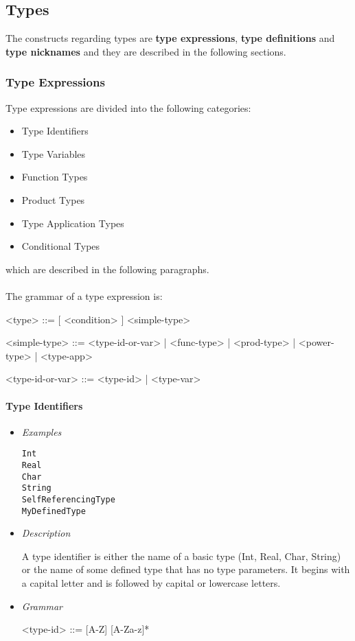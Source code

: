 \documentclass{article}
\begin{document}
\subsection{Types}
\label{subsec:types}

The constructs regarding types are \textbf{type expressions}, \textbf{type
definitions} and \textbf{type nicknames} and they are described in the
following sections.

\subsubsection{Type Expressions}

Type expressions are divided into the following categories:
\begin{itemize}
\item Type Identifiers
\item Type Variables
\item Function Types
\item Product Types
\item Type Application Types
\item Conditional Types
\end{itemize}
which are described in the following paragraphs.
\\\\
The grammar of a type expression is:
\begin{grammar}
<type> ::= [ <condition> ]  <simple-type> 

<simple-type> ::=
<type-id-or-var> | <func-type> | <prod-type> | <power-type> | <type-app>

<type-id-or-var> ::= <type-id> | <type-var>
\\
\end{grammar}
\paragraph{Type Identifiers}

\begin{itemize}
\item \textit{Examples}
\begin{verbatim}
Int
Real 
Char 
String
SelfReferencingType
MyDefinedType
\end{verbatim}

\item \textit{Description}

A type identifier is either the name of a basic type (Int, Real, Char, String) or
the name of some defined type that has no type parameters. It begins with a capital
letter and is followed by capital or lowercase letters.

\item \textit{Grammar}
\begin{grammar}
<type-id> ::= [A-Z] [A-Za-z]*
\end{grammar}
\end{itemize}
\end{document}
